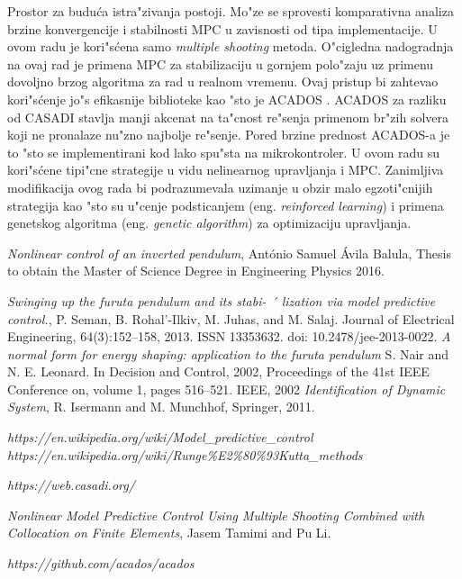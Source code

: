 \documentclass[a4paper,11pt]{article}
\theoremstyle{definition} \newtheorem{deff}{Definicija}[section]
\theoremstyle{definition} \newtheorem{prim}[deff]{Primer}
\theoremstyle{plain} \newtheorem{teor}[deff]{Teorema}
\begin{document}
	Prostor za budu\'ca istra"zivanja postoji. Mo"ze se sprovesti komparativna analiza brzine konvergencije i stabilnosti MPC u zavisnosti od tipa implementacije. U ovom radu je kori"s\'cena samo \emph{multiple shooting} metoda. O"cigledna nadogradnja na ovaj rad je primena MPC za stabilizaciju u gornjem polo"zaju uz primenu dovoljno brzog algoritma za rad u realnom vremenu. Ovaj pristup bi zahtevao kori"s\'cenje jo"s efikasnije biblioteke kao "sto je ACADOS \cite{acados}. ACADOS za razliku od CASADI stavlja manji akcenat na ta"cnost re"senja primenom br"zih solvera koji ne pronalaze nu"zno najbolje re"senje. Pored brzine prednost ACADOS-a je to "sto se implementirani kod lako spu"sta na mikrokontroler. U ovom radu su kori"s\'cene tipi"cne strategije u vidu nelinearnog upravljanja i MPC. Zanimljiva modifikacija ovog rada bi podrazumevala uzimanje u obzir malo egzoti"cnijih strategija kao "sto su u"cenje podsticanjem (eng. \emph{reinforced learning}) i primena genetskog algoritma (eng. \emph{genetic algorithm}) za optimizaciju upravljanja. 
	 
	
	 
	
	\newpage
	
	\begin{thebibliography}{9}
		\emph{Nonlinear control of an inverted pendulum}, António Samuel Ávila Balula, Thesis to obtain the Master of Science Degree in
		Engineering Physics 2016.
		
		\emph{Swinging up the furuta pendulum and its stabi- ´
			lization via model predictive control.}, P. Seman, B. Rohal’-Ilkiv, M. Juhas, and M. Salaj.  Journal of Electrical Engineering, 64(3):152–158, 2013. ISSN
		13353632. doi: 10.2478/jee-2013-0022.
		\emph{A normal form for energy shaping: application to the furuta pendulum}
		S. Nair and N. E. Leonard. 
		In Decision and Control, 2002, Proceedings of the 41st IEEE Conference on, volume 1, pages
		516–521. IEEE, 2002
		\emph{Identification of Dynamic System}, R. Isermann and M. Munchhof, Springer, 2011.
		
		 \emph{https://en.wikipedia.org/wiki/Model\_predictive\_control}
		\emph{https://en.wikipedia.org/wiki/Runge\%E2\%80\%93Kutta\_methods}
		
		\emph{https://web.casadi.org/}
		
		\emph{Nonlinear Model Predictive Control Using Multiple Shooting Combined with 
		Collocation on Finite Elements}, Jasem Tamimi and Pu Li.
		
		 \emph{https://github.com/acados/acados}
		
	\end{thebibliography}
\end{document}
